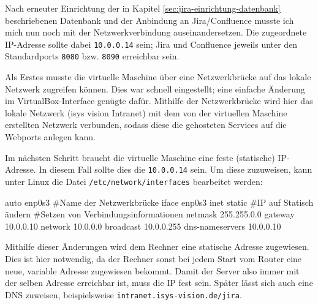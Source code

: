 \documentclass[xcolor=dvipsnames,11pt,paper=a4paper]{report}
\begin{document}
Nach erneuter Einrichtung der in Kapitel \ref{sec:jira-einrichtung-datenbank} beschriebenen
Datenbank und der Anbindung an Jira/Confluence musste ich mich nun noch mit der
Netzwerkverbindung auseinandersetzen. Die zugeordnete IP-Adresse sollte dabei
\texttt{10.0.0.14} sein; Jira und Confluence jeweils unter den Standardports
\texttt{8080} bzw. \texttt{8090} erreichbar sein.

Als Erstes musste die virtuelle Maschine über eine Netzwerkbrücke auf das lokale
Netzwerk zugreifen können. Dies war schnell eingestellt; eine einfache Änderung
im VirtualBox-Interface genügte dafür. Mithilfe der Netzwerkbrücke wird hier das
lokale Netzwerk (isys vision Intranet) mit dem von der virtuellen Maschine erstellten
Netzwerk verbunden, sodass diese die gehosteten Services auf die Webports anlegen
kann.

Im nächsten Schritt braucht die virtuelle Maschine eine feste (statische) IP-Adresse.
In diesem Fall sollte dies die \texttt{10.0.0.14} sein. Um diese zuzuweisen, kann
unter Linux die Datei \texttt{/etc/network/interfaces} bearbeitet werden:
\begin{code}[language=bash, caption={Änderungen in \texttt{/etc/network/interfaces}}]
auto enp0s3 #Name der Netzwerkbrücke
iface enp0s3 inet static #IP auf Statisch ändern
#Setzen von Verbindungsinformationen
netmask 255.255.0.0
gateway 10.0.0.10
network 10.0.0.0
broadcast 10.0.0.255
dns-nameservers 10.0.0.10
\end{code}
Mithilfe dieser Änderungen wird dem Rechner eine statische Adresse zugewiesen. Dies
ist hier notwendig, da der Rechner sonst bei jedem Start vom Router eine neue, variable
Adresse zugewiesen bekommt. Damit der Server also immer mit der selben Adresse erreichbar
ist, muss die IP fest sein. Später lässt sich auch eine DNS zuweisen, beispielsweise
\texttt{intranet.isys-vision.de/jira}.




\end{document}

